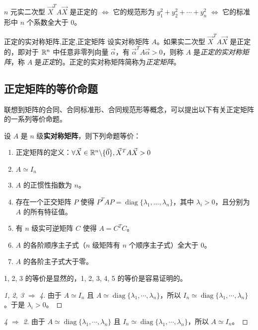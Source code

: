 \begin{theorem}
	$n$ 元实二次型 $\vec X^T A \vec X$ 是正定的 $\Longleftrightarrow$ 它的规范形为 $y_1^2 + y_2^2 + \cdots + y_n^2$ $\Longleftrightarrow$ 它的标准形中 $n$ 个系数全大于 $0$。
\end{theorem}

\begin{definition}{正定的实对称矩阵,正定,正定矩阵}
	设实对称矩阵 $A$。如果实二次型 $\vec X^T A \vec X$ 是正定的，即对于 $\mathbb R^n$ 中任意非零列向量 $\vec \alpha$，有 $\vec \alpha^T A \vec \alpha > 0$，则称 $A$ 是\emph{正定的实对称矩阵}，称 $A$ 是\emph{正定}的。正定的实对称矩阵简称为\emph{正定矩阵}。
\end{definition}

\subsection{正定矩阵的等价命题}

联想到矩阵的合同、合同标准形、合同规范形等概念，可以提出以下有关正定矩阵的一系列等价命题。

设 $A$ 是 $n$ 级\textbf{实对称矩阵}，则下列命题等价：

\begin{enumerate}
	\item 正定矩阵的定义：$\forall \vec X \in \mathbb R^n \backslash \{\vec 0\}, \vec X^T A \vec X > 0$
	\item $A \simeq I_n$
	\item $A$ 的正惯性指数为 $n$。
	\item 存在一个正交矩阵 $P$ 使得 $P^T A P = \operatorname{diag}\{ \lambda_1, \ldots, \lambda_n \}$，其中 $\lambda_i > 0$，且分别为 $A$ 的所有特征值。
	\item 有 $n$ 级实可逆矩阵 $C$ 使得 $A = C^T C$。
	\item $A$ 的各阶顺序主子式（$n$ 级矩阵有 $n$ 个顺序主子式）全大于 $0$。
	\item $A$ 的各阶主子式大于零。
\end{enumerate}

1, 2, 3 的等价是显然的，1, 2, 3, 4, 5 的等价是容易证明的。

\begin{proof}[1, 2, 3 $\Longrightarrow$ 4]
	由于 $A \simeq I_n$ 且 $A \simeq \operatorname{diag} \{ \lambda_1, \cdots, \lambda_n \}$，所以 $I_n \simeq \operatorname{diag} \{ \lambda_1, \cdots, \lambda_n \}$。于是 $\lambda_i > 0$。
\end{proof}

\begin{proof}[4 $\Longrightarrow$ 2]
	由于 $A \simeq \operatorname{diag} \{ \lambda_1, \cdots, \lambda_n \}$ 且 $I_n \simeq \operatorname{diag} \{ \lambda_1,  \cdots, \lambda_n \}$，所以 $A \simeq I_n$。
\end{proof}

